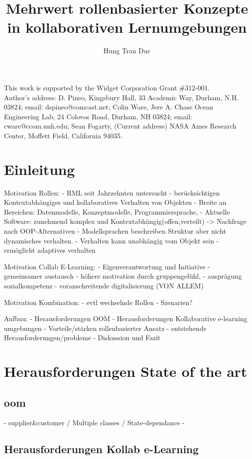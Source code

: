 \documentclass[prodmode,acmtap]{acmlarge}
\title{Mehrwert rollenbasierter Konzepte in kollaborativen Lernumgebungen}
\author{Hung Tran Duc \affil{Technische Universität Dresden} }
\begin{document}
\begin{bottomstuff}
This work is supported by the Widget Corporation Grant \#312-001.\\
Author's address: D. Pineo, Kingsbury Hall, 33 Academic Way, Durham,
N.H. 03824; email: dspineo@comcast.net; Colin Ware, Jere A. Chase
Ocean Engineering Lab, 24 Colovos Road, Durham, NH 03824; email: cware@ccom.unh.edu;
Sean Fogarty, (Current address) NASA Ames Research Center, Moffett Field, California 94035.
\end{bottomstuff}


\maketitle

\section{Einleitung}
Motivation Rollen:
- RML seit Jahrzehnten untersucht
- berücksichtigen Kontextabhängiges und kollaboratives Verhalten von Objekten
- Breite an Bereichen: Datenmodelle, Konzeptmodelle, Programmiersprache,
- Aktuelle Software: zunehmend komplex und Kontextabhängig(offen,verteilt) -> Nachfrage nach OOP-Alternativen
- Modellsprachen beschreiben Struktur aber nicht dynamisches verhalten.
- Verhalten kann unabhängig vom Objekt sein
- ermöglicht adaptives verhalten

Motivation  Collab E-Learning:
- Eigenverantwortung und Initiative
- gemeinsamer austausch
- höhere motivation durch gruppengefühl, 
- ausprägung sozialkompetenz
- voranschreitende digitalisierung (VON ALLEM) 

Motivation Kombination:
- evtl wechselnde Rollen
- Szenarien? 

Aufbau:
- Herausforderungen OOM
- Herausforderungen Kollaborative e-learning umgebungen
- Vorteile/stärken rollenbasierter Ansatz
- entstehende Herausforderungen/probleme
- Diskussion und Fazit


\section{Herausforderungen State of the art}
\subsection{oom}

- supplier&customer / Multiple classes / State-dependance
- 
\subsection{Herausforderungen Kollab e-Learning}
\end{document}
